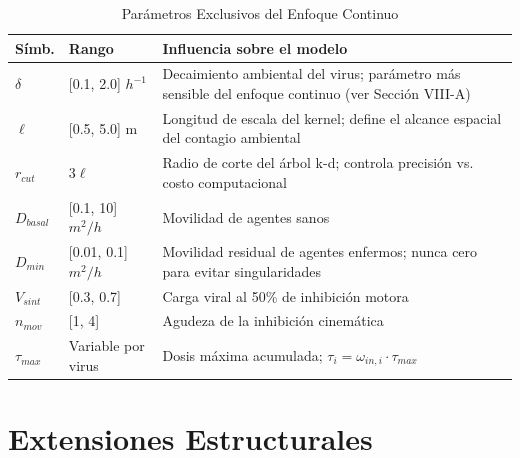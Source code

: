 \documentclass[conference]{IEEEtran}
\begin{document}
\begin{table}[!t]
\renewcommand{\arraystretch}{1.25}
\caption{Parámetros Exclusivos del Enfoque Continuo}
\label{tab:param_continuo}
\centering
\begin{tabular}{p{1.3cm}p{1.4cm}p{4.0cm}}
\hline
\textbf{Símb.} & \textbf{Rango} & \textbf{Influencia sobre el modelo} \\
\hline
$\delta$ & [0.1, 2.0] $h^{-1}$ & Decaimiento ambiental del virus; parámetro más sensible del enfoque continuo (ver Sección VIII-A) \\
$\ell$ & [0.5, 5.0] m & Longitud de escala del kernel; define el alcance espacial del contagio ambiental \\
$r_{cut}$ & $3\ell$ & Radio de corte del árbol k-d; controla precisión vs. costo computacional \\
$D_{basal}$ & [0.1, 10] $m^2/h$ & Movilidad de agentes sanos \\
$D_{min}$ & [0.01, 0.1] $m^2/h$ & Movilidad residual de agentes enfermos; nunca cero para evitar singularidades \\
$V_{sint}$ & [0.3, 0.7] & Carga viral al 50\% de inhibición motora \\
$n_{mov}$ & [1, 4] & Agudeza de la inhibición cinemática \\
$\tau_{max}$ & Variable por virus & Dosis máxima acumulada; $\tau_i = \omega_{in,i}\cdot\tau_{max}$ \\
\hline
\end{tabular}
\end{table}

\section{Extensiones Estructurales}
\end{document}
